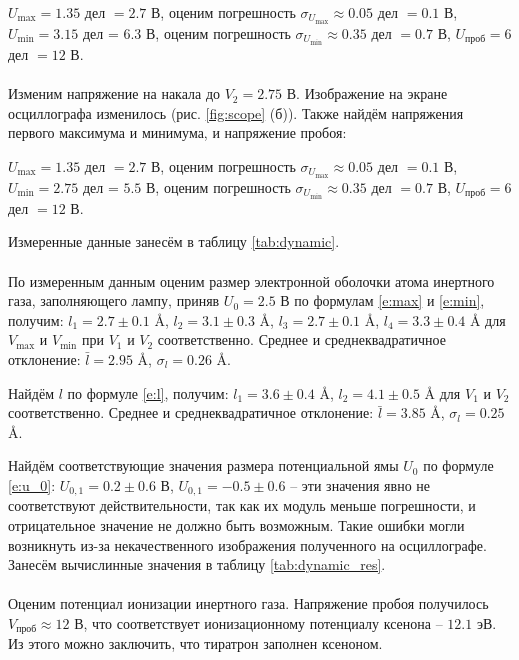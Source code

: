 \documentclass[a4paper,12pt]{article} %
\begin{document}
$U_{\max} = 1.35$ дел $= 2.7$ В, оценим погрешность $\sigma_{U_{\max}} \approx 0.05$ дел $= 0.1$ В, $U_{\min} = 3.15$ дел = $ 6.3$ В, оценим погрешность $\sigma_{U_{\min}} \approx 0.35$ дел $= 0.7$ В, $U_\text{проб} = 6$ дел $= 12$ В.

\paragraph{} Изменим напряжение на накала до $V_2 = 2.75$ В. Изображение на экране осциллографа изменилось (рис. \ref{fig:scope} (б)). Также найдём напряжения первого максимума и минимума, и  напряжение пробоя: 

$U_{\max} = 1.35$ дел $= 2.7$ В, оценим погрешность $\sigma_{U_{\max}} \approx 0.05$ дел $= 0.1$ В, $U_{\min} = 2.75$ дел = $ 5.5$ В, оценим погрешность $\sigma_{U_{\min}} \approx 0.35$ дел $= 0.7$ В, $U_\text{проб} = 6$ дел $= 12$ В.

Измеренные данные занесём в таблицу \ref{tab:dynamic}.

\paragraph{} По измеренным данным оценим размер электронной оболочки атома инертного газа, заполняющего лампу, приняв $U_0 = 2.5$ В по формулам \eqref{e:max} и \eqref{e:min}, получим: $l_1 = 2.7 \pm 0.1 $ Å, $l_2 = 3.1 \pm 0.3 $ Å, $l_3 = 2.7 \pm 0.1 $ Å, $l_4 = 3.3 \pm 0.4 $ Å для $V_{\max}$ и $V_{\min}$ при $V_1$ и $V_2$ соответственно. Среднее и среднеквадратичное отклонение: $\bar{l} = 2.95$ Å, $\sigma_l = 0.26$ Å.

Найдём $l$ по формуле \eqref{e:l}, получим: $l_1 = 3.6 \pm 0.4$ Å, $l_2 = 4.1 \pm 0.5$ Å для $V_1$ и $V_2$ соответственно. Среднее и среднеквадратичное отклонение: $\bar{l} = 3.85$ Å, $\sigma_l = 0.25$ Å. 

Найдём соответствующие значения размера потенциальной ямы $U_0$ по формуле \eqref{e:u_0}: $U_{0,1} = 0.2 \pm 0.6$ В, $U_{0,1} = -0.5 \pm 0.6$ -- эти значения явно не соответствуют действительности, так как их модуль меньше погрешности, и отрицательное значение не должно быть возможным. Такие ошибки могли возникнуть из-за некачественного изображения полученного на осциллографе. Занесём вычислинные значения в таблицу \ref{tab:dynamic_res}.

\paragraph{} Оценим потенциал ионизации инертного газа. Напряжение пробоя получилось $V_\text{проб} \approx 12$ В, что соответствует ионизационному потенциалу ксенона -- $12.1$ эВ. Из этого можно заключить, что тиратрон заполнен ксеноном.
\end{document}
